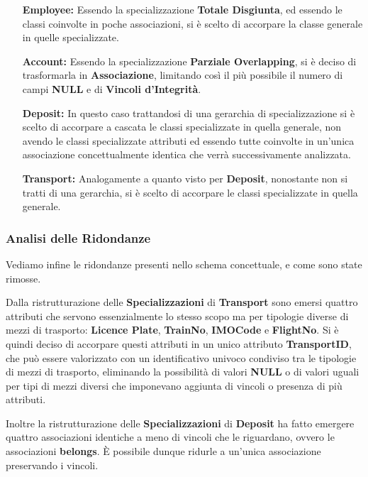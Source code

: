 \begin{itemize}
  \item[\textbf{Employee:}] Essendo la specializzazione \textbf{Totale Disgiunta}, ed essendo le classi coinvolte in poche associazioni, si è scelto di accorpare la classe generale in quelle specializzate.
  \item[\textbf{Account:}] Essendo la specializzazione \textbf{Parziale Overlapping}, si è deciso di trasformarla in \textbf{Associazione}, limitando così il più possibile il numero di campi \textbf{NULL} e di \textbf{Vincoli d'Integrità}.
  \item[\textbf{Deposit:}] In questo caso trattandosi di una gerarchia di specializzazione si è scelto di accorpare a cascata le classi specializzate in quella generale, non avendo le classi specializzate attributi ed essendo tutte coinvolte in un'unica associazione concettualmente identica che verrà successivamente analizzata.
  \item[\textbf{Transport:}] Analogamente a quanto visto per \textbf{Deposit}, nonostante non si tratti di una gerarchia, si è scelto di accorpare le classi specializzate in quella generale. 
\end{itemize}

\subsubsection{Analisi delle Ridondanze}\label{Redundancy analysis}

Vediamo infine le ridondanze presenti nello schema concettuale, e come sono state rimosse.

Dalla ristrutturazione delle \textbf{Specializzazioni} di \textbf{Transport} sono emersi quattro attributi che servono essenzialmente lo stesso scopo ma per tipologie diverse di mezzi di trasporto: \textbf{Licence Plate}, \textbf{TrainNo}, \textbf{IMOCode} e \textbf{FlightNo}. Si è quindi deciso di accorpare questi attributi in un unico attributo \textbf{TransportID}, che può essere valorizzato con un identificativo univoco condiviso tra le tipologie di mezzi di trasporto, eliminando la possibilità di valori \textbf{NULL} o di valori uguali per tipi di mezzi diversi che imponevano aggiunta di vincoli o presenza di più attributi.

Inoltre la ristrutturazione delle \textbf{Specializzazioni} di \textbf{Deposit} ha fatto emergere quattro associazioni identiche a meno di vincoli che le riguardano, ovvero le associazioni \textbf{belongs}. È possibile dunque ridurle a un'unica associazione preservando i vincoli.

